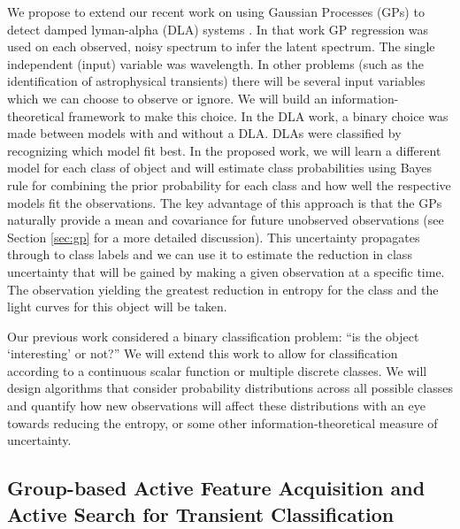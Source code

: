 \documentclass[prd,nofootbib,floatfix,11pt,tightenlines,nofootinbib]{revtex4}
\begin{document}
We propose to extend our
recent work on using Gaussian Processes (GPs) to detect damped
lyman-alpha (DLA) systems \cite{Garnett12a}.  In that work GP
regression was used on each observed, noisy spectrum to infer the
latent spectrum.  The single independent (input) variable was
wavelength.  In other problems (such as the identification of
astrophysical transients) there will be several input variables which
we can choose to observe or ignore.  
We will build an information-theoretical framework to make this choice.
In the DLA work, a binary choice was made between models with and
without a DLA.  DLAs were
classified by recognizing which model fit best.  In the proposed work,
we will learn a different model for each class of object and will
estimate class probabilities using Bayes rule for combining the prior
probability for each class and how well the respective models fit the
observations.  
The key advantage of this
approach is that the GPs naturally provide a mean and covariance for
future unobserved observations (see Section \ref{sec:gp} for a more detailed
discussion).  This uncertainty propagates through
to class labels and we can use it to estimate the reduction in class
uncertainty that will be gained by making a given observation at a
specific time.  The observation yielding the greatest reduction in
entropy for the class and the light curves for this object will be
taken.

 Our previous work considered a binary classification problem: ``is
the object `interesting' or not?''  We will extend this work to allow for
classification according to a continuous scalar function or multiple discrete
classes.  We will design algorithms that consider probability distributions
across all possible classes and
quantify how new observations will affect these
distributions with an eye towards reducing the entropy, or some other
information-theoretical measure of uncertainty.

\subsection{Group-based Active Feature Acquisition and Active Search
for Transient Classification}
\end{document}
